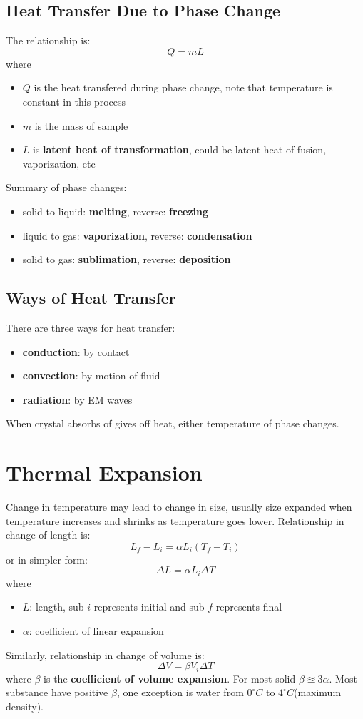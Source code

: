 \documentclass[10pt,a4paper,oneside]{article}
\begin{document}
\subsection{Heat Transfer Due to Phase Change}
The relationship is:
\[
Q = mL
\]
where
\begin{itemize}
	\item $Q$ is the heat transfered during phase change, note that temperature is constant in this process
	\item $m$ is the mass of sample
	\item $L$ is \textbf{latent heat of transformation}, could be latent heat of fusion, vaporization, etc
\end{itemize}
Summary of phase changes:
\begin{itemize}
	\item solid to liquid: \textbf{melting}, reverse: \textbf{freezing}
	\item liquid to gas: \textbf{vaporization}, reverse: \textbf{condensation}
	\item solid to gas: \textbf{sublimation}, reverse: \textbf{deposition}
\end{itemize}

\subsection{Ways of Heat Transfer}
There are three ways for heat transfer:
\begin{itemize}
	\item \textbf{conduction}: by contact
	\item \textbf{convection}: by motion of fluid
	\item \textbf{radiation}: by EM waves
\end{itemize}
When crystal absorbs of gives off heat, either temperature of phase changes.

\section{Thermal Expansion}
Change in temperature may lead to change in size, usually size expanded when temperature increases and shrinks as temperature goes lower. Relationship in change of length is:
\[
L_f - L_i = \alpha L_i(T_f- T_i)
\]
or in simpler form:
\[
\Delta L = \alpha L_i \Delta T
\]
where
\begin{itemize}
	\item $L$: length, sub $i$ represents initial and sub $f$ represents final
	\item $\alpha$: coefficient of linear expansion
\end{itemize}
Similarly, relationship in change of volume is:
\[
\Delta V = \beta V_i \Delta T
\]
where $\beta$ is the \textbf{coefficient of volume expansion}. For most solid $\beta \approxeq 3\alpha$. Most substance have positive $\beta$, one exception is water from $0^\circ C$ to $4^\circ C$(maximum density).
\end{document}
